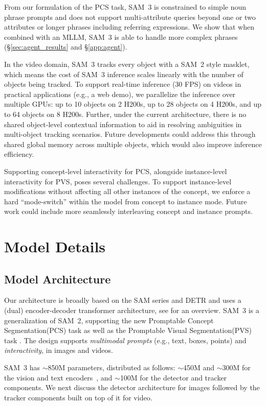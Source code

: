 \documentclass[]{fairmeta}
\newcommand{\eg}{e.g., }
\newcommand{\samtwo}{SAM~2\xspace}
\newcommand{\model}{SAM~3\xspace}
\newcommand{\pvstasklong}{Promptable Visual Segmentation\xspace}
\newcommand{\pvstask}{PVS\xspace}
\newcommand{\tasklong}{Promptable Concept Segmentation\xspace}
\newcommand{\task}{PCS\xspace}
\begin{document}
From our formulation of the \task task, \model is constrained to simple noun phrase prompts and does not support multi-attribute queries beyond one or two attributes or longer phrases including referring expressions. We show that when combined with an MLLM, \model is able to handle more complex phrases (\S\ref{sec:agent_results} and \S\ref{app:agent}). 

In the video domain, \model tracks every object with a \samtwo style masklet, which means the cost of \model inference scales linearly with the number of objects being tracked. To support real-time inference (30 FPS) on videos in practical applications (e.g., a web demo), we parallelize the inference over multiple GPUs: up to 10 objects on 2 H200s, up to 28 objects on 4 H200s, and up to 64 objects on 8 H200s. Further, under the current architecture, there is no shared object-level contextual information to aid in resolving ambiguities in multi-object tracking scenarios. Future developments could address this through shared global memory across multiple objects, which would also improve inference efficiency.

Supporting concept-level interactivity for \task, alongside instance-level interactivity for PVS, poses several challenges. To support instance-level modifications without affecting all other instances of the concept, we enforce a hard ``mode-switch'' within the model from concept to instance mode. Future work could include more seamlessly interleaving concept and instance prompts.


\section{Model Details}\label{app:sec:model}

\subsection{Model Architecture}
Our architecture is broadly based on the SAM series \citep{sam2, sam} and DETR \citep{carion2020end} and uses a (dual) encoder-decoder transformer architecture, see  for an overview. 
\model is a generalization of \samtwo, supporting the new \tasklong (\task) task as well as the \pvstasklong (\pvstask) task \citep{sam2}. The design supports \textit{multimodal prompts} (\eg text, boxes, points) and \textit{interactivity}, in images and videos. 

\model has $\sim$850M parameters, distributed as follows: $\sim$450M and $\sim$300M for the vision and text encoders~\citep{bolya2025PerceptionEncoder}, and $\sim$100M for the detector and tracker components.
We next discuss the detector architecture for images followed by the tracker components built on top of it for video. 
\end{document}
